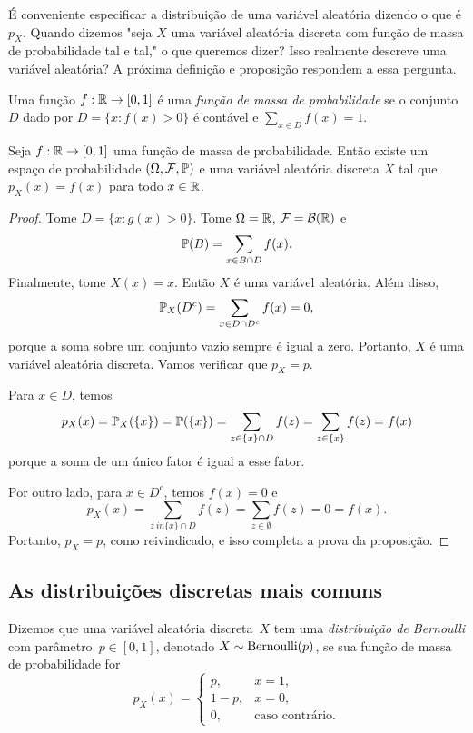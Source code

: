 É conveniente especificar a distribuição de uma variável aleatória dizendo o que é $ p_X $.
Quando dizemos "seja $ X $ uma variável aleatória discreta com função de massa de probabilidade tal e tal," o que queremos dizer?
Isso realmente descreve uma variável aleatória?
A próxima definição e proposição respondem a essa pergunta.

\begin{definition}
Uma função $ f:\mathbb{R} \to [0,1] $ é uma \emph{função de massa de probabilidade} se o conjunto $ D $ dado por $ D = \{x:f(x)>0\} $ é contável e $ \sum_{x \in D} f(x) = 1 $.
\end{definition}

\begin{proposition}
Seja $ f:\mathbb{R}\to[0,1] $ uma função de massa de probabilidade.
Então existe um espaço de probabilidade $ (\Omega,\mathcal F,\mathbb{P}) $ e uma variável aleatória discreta $ X $ tal que $ p_X(x) = f(x) $ para todo $ x \in \mathbb{R} $.
\end{proposition}
\begin{proof}
Tome $ D = \{ x : g(x)> 0 \} $.
Tome $ \Omega = \mathbb{R} $, $ \mathcal F = \mathcal B(\mathbb{R}) $ e
$$ \mathbb{P}(B) = \sum_{x \in B \cap D} f(x). $$
Finalmente, tome $ X(x)=x $.
Então $ X $ é uma variável aleatória.
Além disso,
$$ \mathbb{P}_X(D^c) = \sum_{x \in D \cap D^c} f(x) = 0 ,$$
porque a soma sobre um conjunto vazio sempre é igual a zero.
Portanto, $ X $ é uma variável aleatória discreta.
Vamos verificar que $ p_X = p $.

Para $ x \in D $, temos
$$
p_X(x) = \mathbb{P}_X(\{x\}) = \mathbb{P}(\{x\}) = \sum_{z \in \{x\}\cap D}f(z) =
\sum_{z \in \{x\}}f(z) = f(x)
$$
porque a soma de um único fator é igual a esse fator.

Por outro lado, para $ x \in D^c $, temos $ f(x)=0 $ e
$$
p_X(x) =
\sum_{z \ in \{x\}\cap D}f(z) =
\sum_{z \in \emptyset} f(z) = 0 = f(x)
.
$$
Portanto, $ p_X = p $, como reivindicado, e isso completa a prova da proposição.
\end{proof}

\subsection{As distribuições discretas mais comuns}

\begin{definition}
Dizemos que uma variável aleatória discreta~$X$ tem uma
\emph{distribuição de Bernoulli} com parâmetro~$p \in [0,1]$,
denotado
$X \sim \mathrm{Bernoulli} (p)$,
se sua função de massa de probabilidade for
\[
p_X(x) =
\begin{cases}
p ,& x=1,
\\
1-p ,& x=0,
\\
0 ,& \text{caso contrário.}
\end{cases}
\]
\end{definition}


